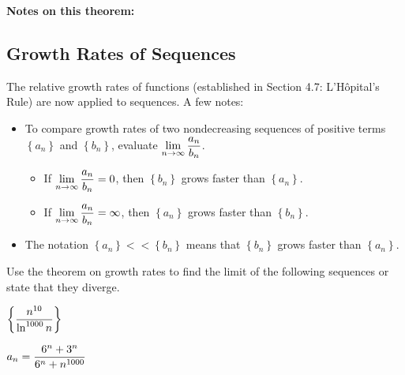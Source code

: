 \documentclass[12pt]{article}
\begin{document}
\vfill


\vspace{5mm}

\textbf{Notes on this theorem:}

\vfill

\newpage

\subsection*{Growth Rates of Sequences}

The relative growth rates of functions (established in Section 4.7: L'H\^opital's Rule) are now applied to sequences. A few notes:
\begin{itemize}
	\item To compare growth rates of two nondecreasing sequences of positive terms $\left\{a_n\right\}$ and $\left\{b_n\right\}$, evaluate $\displaystyle\lim_{n\to\infty}\frac{a_n}{b_n}$.
	\begin{itemize}
		\item If $\displaystyle\lim_{n\to\infty}\frac{a_n}{b_n}=0$, then $\left\{b_n\right\}$ grows faster than $\left\{a_n\right\}$.
		\item If $\displaystyle\lim_{n\to\infty}\frac{a_n}{b_n}=\infty$, then $\left\{a_n\right\}$ grows faster than $\left\{b_n\right\}$.
	\end{itemize}
\item The notation $\left\{a_n\right\}<<\left\{b_n\right\}$ means that $\left\{b_n\right\}$ grows faster than $\left\{a_n\right\}$. 
\end{itemize}

\vspace{2mm}


\Examples Use the theorem on growth rates to find the limit of the following sequences or state that they diverge.

\vspace{5mm}

$\displaystyle\left\{\frac{n^{10}}{\ln^{1000}n}\right\}$

\vfill

$a_n=\displaystyle\frac{6^n+3^n}{6^n+n^{1000}}$

\vfill
\end{document}
